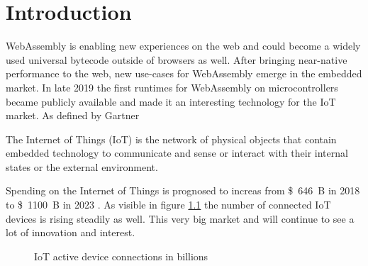
\chapter{Introduction}\label{chapter:introduction}

WebAssembly is enabling new experiences on the web and could become a widely used universal bytecode outside of browsers as well. After bringing near-native performance to the web, new use-cases for WebAssembly emerge in the embedded market. In late 2019 the first runtimes for WebAssembly on microcontrollers became publicly available and made it an interesting technology for the IoT market. As defined by Gartner \autocite{gartner_internet_nodate}
\begin{displayquote}
    The Internet of Things (IoT) is the network of physical objects that contain embedded technology to communicate and sense or interact with their internal states or the external environment.
\end{displayquote}

Spending on the Internet of Things is prognosed to increas from \SI{646}[\$]{B} in 2018 to \SI{1100}[\$]{B} in 2023 \autocite{idc_prognosis_2019}. As visible in figure \ref{fig:iot_connections} the number of connected IoT devices is rising steadily as well. This very big market \autocite{gartner_internet_nodate-1} and will continue to see a lot of innovation and interest.

\begin{figure}[h]
    \caption{IoT active device connections in billions \autocite{iot_analytics_internet_2018}}
    \label{fig:iot_connections}
\end{figure}

